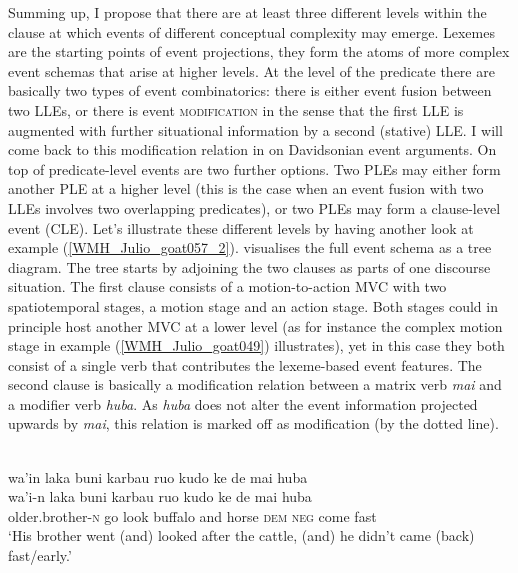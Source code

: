 Summing up, I propose that there are at least three different levels within the clause at which events of different conceptual complexity may emerge. Lexemes are the starting points of event projections, they form the atoms of more complex event schemas that arise at higher levels. At the level of the predicate there are basically two types of event combinatorics: there is either event fusion between two LLEs, or there is event \textsc{modification} in the sense that the first LLE is augmented with further situational information by a second (stative) LLE. I will come back to this modification relation in  on Davidsonian event arguments. On top of predicate-level events are two further options. Two PLEs may either form another PLE at a higher level (this is the case when an event fusion with two LLEs involves two overlapping predicates), or two PLEs may form a clause-level event (CLE). Let's illustrate these different levels by having another look at example (\ref{WMH_Julio_goat057_2}).  visualises the full event schema as a tree diagram. The tree starts by adjoining the two clauses as parts of one discourse situation. The first clause consists of a motion-to-action MVC with two spatiotemporal stages, a motion stage and an action stage. Both stages could in principle host another MVC at a lower level (as for instance the complex motion stage in example (\ref{WMH_Julio_goat049}) illustrates), yet in this case they both consist of a single verb that contributes the lexeme-based event features. The second clause is basically a modification relation between a matrix verb \textit{mai} and a modifier verb \textit{huba}. As \textit{huba} does not alter the event information projected upwards by \textit{mai}, this relation is marked off as modification (by the dotted line).

\ea \label{WMH_Julio_goat057_2}
\\
\glll wa'in laka buni karbau ruo kudo ke de mai huba \\
wa'i-n laka buni karbau ruo kudo ke de mai huba \\
older.brother-\textsc{n} go look buffalo and horse \textsc{dem} \textsc{neg} come fast\\
\glft `His brother went (and) looked after the cattle, (and) he didn't came (back) fast/early.'\\ 
\z

